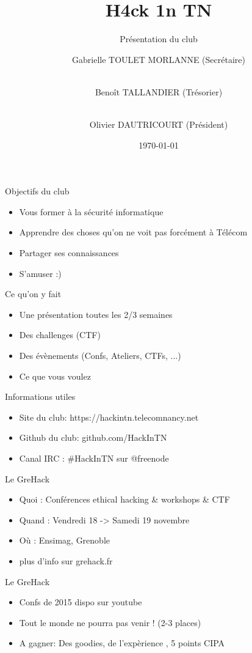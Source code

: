\documentclass{beamer}
\title[Présentation]{H4ck 1n TN}
\subtitle{Présentation du club}
\author[H4ck1nTN]{
	Gabrielle TOULET MORLANNE (Secrétaire)
\and \\
Benoît TALLANDIER (Trésorier)
\and \\
Olivier DAUTRICOURT (Président)
}
\institute[HiT]{Ceten -- TELECOM Nancy}
\date{\today}
\begin{document}
\begin{frame}
\titlepage
\end{frame} 


\begin{frame}{Objectifs du club}
	\begin{itemize}
		\item Vous former à la sécurité informatique
		\item Apprendre des choses qu'on ne voit pas forcément à Télécom
		\item Partager ses connaissances
		\item S'amuser :)
	\end{itemize}
	
\end{frame}


\begin{frame}{Ce qu'on y fait}
	\begin{itemize}
		\item Une présentation toutes les 2/3 semaines
		\item Des challenges (CTF)
		\item Des évènements (Confs, Ateliers, CTFs, ...)
		\item Ce que vous voulez 
	\end{itemize}
\end{frame}

\begin{frame}{Informations utiles}
	\begin{itemize}
		\item Site du club: https://hackintn.telecomnancy.net
		\item Github du club: github.com/HackInTN
		\item Canal IRC : \#HackInTN sur @freenode
	\end{itemize}
\end{frame}

\begin{frame} {Le GreHack}
	\begin{itemize}
		\item Quoi : Conférences ethical hacking \& workshops \& CTF 
		\item Quand : Vendredi 18 -> Samedi 19  novembre
		\item Où : Ensimag, Grenoble 
		\item plus d'info sur grehack.fr
	\end{itemize}
\end{frame}

\begin{frame} {Le GreHack}
	\begin{itemize}
		\item Confs de 2015 dispo sur youtube
		\item Tout le monde ne pourra pas venir ! (2-3 places)
		\item A gagner: Des goodies, de l'expèrience , 5 points CIPA
	\end{itemize}
\end{frame}
\end{document}
